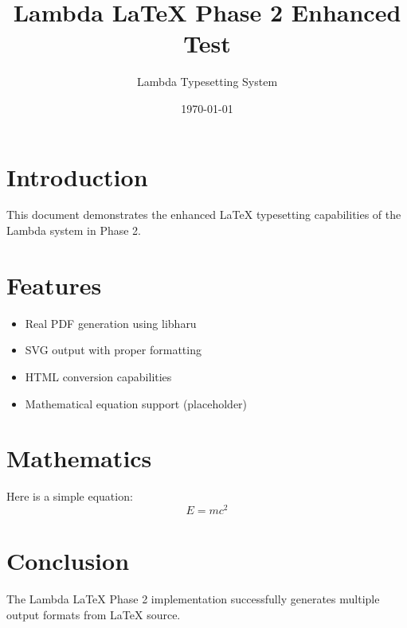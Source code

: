 \documentclass{article}
\title{Lambda LaTeX Phase 2 Enhanced Test}
\author{Lambda Typesetting System}
\date{\today}
\begin{document}
\maketitle

\section{Introduction}
This document demonstrates the enhanced LaTeX typesetting capabilities of the Lambda system in Phase 2.

\section{Features}
\begin{itemize}
\item Real PDF generation using libharu
\item SVG output with proper formatting
\item HTML conversion capabilities
\item Mathematical equation support (placeholder)
\end{itemize}

\section{Mathematics}
Here is a simple equation:
\begin{equation}
E = mc^2
\end{equation}

\section{Conclusion}
The Lambda LaTeX Phase 2 implementation successfully generates multiple output formats from LaTeX source.
\end{document}
